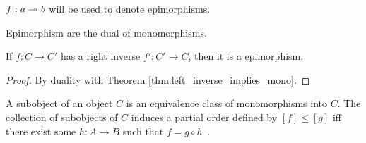 \begin{remark}
  $f:a\twoheadrightarrow b$ will be used to denote epimorphisms.
\end{remark}

\begin{remark}
  Epimorphism are the dual of monomorphisms.
\end{remark}

\begin{theorem}\label{thm:right_inverse_implies_epi}
  If $f:C\to C'$ has a right inverse $f':C'\to C$, then it is a epimorphism.

  \begin{proof}
    By duality with Theorem \ref{thm:left_inverse_implies_mono}.
  \end{proof}
\end{theorem}

\begin{definition}[Subobject]
  A subobject of an object $C$ is an equivalence class of monomorphisms into
  $C$. The collection of subobjects of $C$ induces a partial order defined by
  $[f]\leq[g]$ iff there exist some $h: A\to B$ such that $f = g\circ
  h$~\parencite[p.~11]{lane_moerdijk:sheaves_geometry_logic}.
\end{definition}